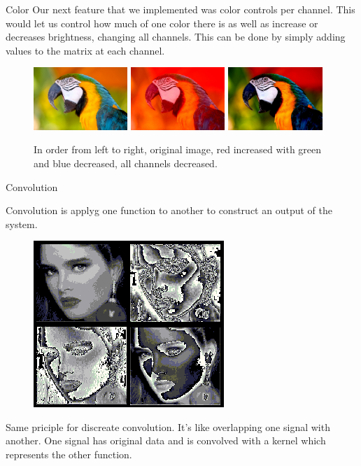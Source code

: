 \documentclass{beamer}
\begin{document}
\begin{frame}{Color}
Our next feature that we implemented was color controls per channel. This would let us control how much of one color there is as well as increase or decreases brightness, changing all channels. This can be done by simply adding values to the matrix at each channel.

\begin{figure}[ht]
\includegraphics[width=1.4in]{parrot.jpg}
\hspace{.1in} 
\includegraphics[width=1.4in]{parrotout1.jpg}
\hspace{.1in}
\includegraphics[width=1.4in]{parrotout2.jpg}
\hspace{.1in}
\caption{In order from left to right, original image, red increased with green and blue decreased, all channels decreased.}
\end{figure}
\end{frame}

\begin{frame}{Convolution}

Convolution is apply‌g one function to another to construct an output of the system. 
\newline

\begin{figure}
\begin{center}
\includegraphics[width= 1.4 in]{convolution.png}
\end{center}
\end{figure}
Same priciple for discreate convolution. It's like overlapping one signal with another. One signal has original data and is convolved with a kernel which represents the other function. 


\end{frame}
\end{document}
